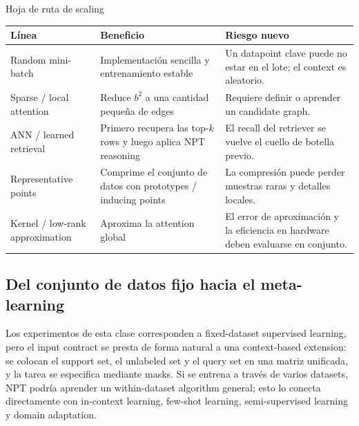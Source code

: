 \documentclass[a4paper]{article}
\begin{document}
\begin{knowledgebox}{Hoja de ruta de scaling}
\begin{tabularx}{\textwidth}{L{0.24\textwidth}>{\raggedright\arraybackslash}X >{\raggedright\arraybackslash}X}
\toprule
Línea & Beneficio & Riesgo nuevo \\
\midrule
Random mini-batch & Implementación sencilla y entrenamiento estable & Un datapoint clave puede no estar en el lote; el context es aleatorio. \\
Sparse / local attention & Reduce $b^2$ a una cantidad pequeña de edges & Requiere definir o aprender un candidate graph. \\
ANN / learned retrieval & Primero recupera las top-$k$ rows y luego aplica NPT reasoning & El recall del retriever se vuelve el cuello de botella previo. \\
Representative points & Comprime el conjunto de datos con prototypes / inducing points & La compresión puede perder muestras raras y detalles locales. \\
Kernel / low-rank approximation & Aproxima la attention global & El error de aproximación y la eficiencia en hardware deben evaluarse en conjunto. \\
\bottomrule
\end{tabularx}
\end{knowledgebox}

\subsection{Del conjunto de datos fijo hacia el meta-learning}

Los experimentos de esta clase corresponden a fixed-dataset supervised learning, pero el input contract se presta de forma natural a una context-based extension: se colocan el support set, el unlabeled set y el query set en una matriz unificada, y la tarea se especifica mediante masks. Si se entrena a través de varios datasets, NPT podría aprender un within-dataset algorithm general; esto lo conecta directamente con in-context learning, few-shot learning, semi-supervised learning y domain adaptation.

\end{document}
